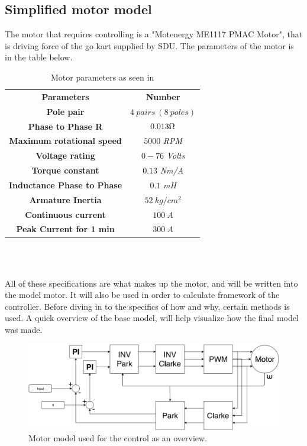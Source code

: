 \subsection{Simplified motor model}
The motor that requires controlling is a "Motenergy ME1117 PMAC Motor", that is driving force of the go kart supplied by SDU. The parameters of the motor is in the table below.

\begin{table} [H]
\centering
\begin{tabular}{|c|c|} \cline{1-2}
\textbf{Parameters} & \textbf{Number} \\ \cline{1-2}
\textbf{Pole pair} & $4\ pairs\ (8\ poles)$ \\ \cline{1-2}
\textbf{Phase to Phase R} & $0.013\ohm$ \\ \cline{1-2}
\textbf{Maximum rotational speed} & $5000$ \textit{RPM} \\ \cline{1-2}
\textbf{Voltage rating} & $0-76$ \textit{Volts} \\ \cline{1-2}
\textbf{Torque constant} & $0.13$ \textit{Nm/A} \\ \cline{1-2}
\textbf{Inductance Phase to Phase} & $0.1$ \textit{mH} \\ \cline{1-2}
\textbf{Armature Inertia} & $52\ kg/cm^2$ \\ \cline{1-2}
\textbf{Continuous current} & $100\ A$ \\ \cline{1-2}
\textbf{Peak Current for 1 min} & $300\ A$ \\ \cline{1-2}  
\end{tabular} \\
\caption{Motor parameters as seen in \cite{Motor_Parameters}}
\label{Motor_parameters_list}
\end{table} \\

All of these specifications are what makes up the motor, and will be written into the model motor. It will also be used in order to calculate framework of the controller. Before diving in to the specifics of how and why, certain methods is used. A quick overview of the base model, will help visualize how the final model was made.\\

\begin{figure} [H]
    \centering
    \includegraphics[scale=0.4]{pictures/control/udklip.PNG}
    \caption{Motor model used for the control as an overview.}
    \label{fig:my_label}
\end{figure} \\

